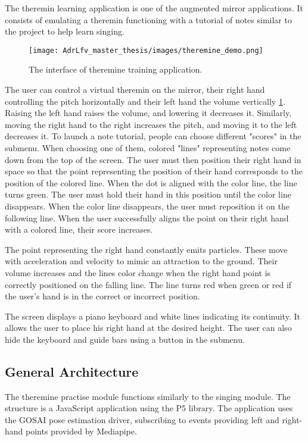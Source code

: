 The theremin learning application is one of the augmented mirror applications. It consists of emulating a theremin functioning with a tutorial of notes similar to the project to help learn singing. 

\begin{figure}[h]
    \centering
    \texttt{[image: AdrLfv\_master\_thesis/images/theremine\_demo.png]}
    \caption{The interface of theremine training application.}
    \label{fig:theremine_demo}
\end{figure}

The user can control a virtual theremin on the mirror, their right hand controlling the pitch horizontally and their left hand the volume vertically \ref{fig:theremine_demo}. Raising the left hand raises the volume, and lowering it decreases it. Similarly, moving the right hand to the right increases the pitch, and moving it to the left decreases it. 
To launch a note tutorial, people can choose different "scores" in the submenu. When choosing one of them, colored "lines" representing notes come down from the top of the screen.
The user must then position their right hand in space so that the point representing the position of their hand corresponds to the position of the colored line. When the dot is aligned with the color line, the line turns green. The user must hold their hand in this position until the color line disappears. When the color line disappears, the user must reposition it on the following line. When the user successfully aligns the point on their right hand with a colored line, their score increases.

The point representing the right hand constantly emits particles. These move with acceleration and velocity to mimic an attraction to the ground. Their volume increases and the lines color change when the right hand point is correctly positioned on the falling line. The line turns red when green or red if the user's hand is in the correct or incorrect position.

The screen displays a piano keyboard and white lines indicating its continuity. It allows the user to place his right hand at the desired height. The user can also hide the keyboard and guide bars using a button in the submenu.

\subsection{General Architecture}

The theremine practise module functions similarly to the singing module. The structure is a JavaScript application using the P5 library. The application uses the GOSAI pose estimation driver, subscribing to events providing left and right-hand points provided by Mediapipe.

